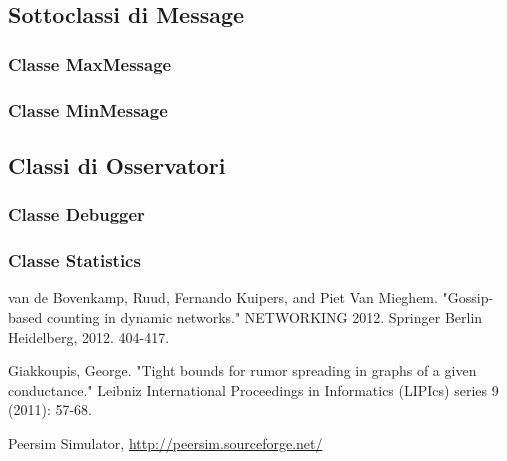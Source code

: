 \documentclass[a4paper,12pt]{article}
\begin{document}


\newpage

\subsection{Sottoclassi di \textsf{Message}}

\subsubsection{Classe \textsf{MaxMessage}}



\subsubsection{Classe \textsf{MinMessage}}



\subsection{Classi di Osservatori}

\subsubsection{Classe \textsf{Debugger}}



\subsubsection{Classe \textsf{Statistics}}



\newpage

\begin{thebibliography}{100}

 van de Bovenkamp, Ruud, Fernando Kuipers, and Piet Van Mieghem. "Gossip-based counting in dynamic networks." NETWORKING 2012. Springer Berlin Heidelberg, 2012. 404-417.

 Giakkoupis, George. "Tight bounds for rumor spreading in graphs of a given conductance." Leibniz International Proceedings in Informatics (LIPIcs) series 9 (2011): 57-68.

 Peersim Simulator, \url{http://peersim.sourceforge.net/}


\end{thebibliography}
\end{document}
